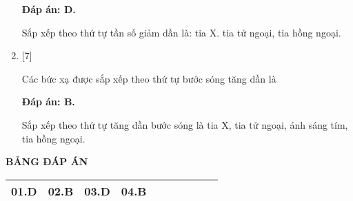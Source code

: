 \begin{enumerate}[label=\bfseries Câu \arabic*:]
	\loigiai
	{		\textbf{Đáp án: D.}
		
		Sắp xếp theo thứ tự tần số giảm dần là: tia X. tia tử ngoại, tia hồng ngoại.
	}

	\item {} [7]
	
	\cauhoi
	{Các bức xạ được sắp xếp theo thứ tự bước sóng tăng dần là
	}
	
	\loigiai
	{		\textbf{Đáp án: B.}
		
		Sắp xếp theo thứ tự tăng dần bước sóng là tia X, tia tử ngoại, ánh sáng tím, tia hồng ngoại.
	}

	
\end{enumerate}

\loigiai
{
	\begin{center}
		\textbf{BẢNG ĐÁP ÁN}
	\end{center}
	\begin{center}
		\begin{tabular}{|m{2.8em}|m{2.8em}|m{2.8em}|m{2.8em}|m{2.8em}|m{2.8em}|m{2.8em}|m{2.8em}|m{2.8em}|m{2.8em}|}
			\hline
			01.D & 02.B  & 03.D  & 04.B  &  & & & & & \\
			\hline
			
		\end{tabular}
	\end{center}
}

\whiteBGstarEnd